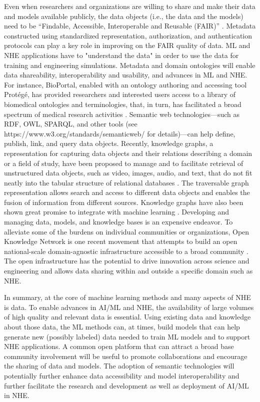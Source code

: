 Even when researchers and organizations are willing to share and make their data and models available publicly, the data objects (i.e., the data and the models) need to be ``Findable, Accessible, Interoperable and Reusable (FAIR)'' \citep{wilkinson2016fair}. Metadata constructed using standardized representation, authorization, and authentication protocols can play a key role in improving on the FAIR quality of data. ML and NHE applications have to "understand the data" in order to use the data for training and engineering simulations. Metadata and domain ontologies will enable data shareability, interoperability and usability, and advances in ML and NHE. For instance, BioPortal, enabled with an ontology authoring and accessing tool Protégé, has provided researchers and interested users access to a library of biomedical ontologies and terminologies, that, in turn, has facilitated a broad spectrum of medical research activities \citep{whetzel2011bioportal}. Semantic web technologies—such as RDF, OWL, SPARQL, and other tools (see https://www.w3.org/standards/semanticweb/ for details)—can help define, publish, link, and query data objects. Recently, knowledge graphs, a representation for capturing data objects and their relations describing a domain or a field of study, have been proposed to manage and to facilitate retrieval of unstructured data objects, such as video, images, audio, and text, that do not fit neatly into the tabular structure of relational databases \citep{paulheim2016knowledge,bonatti2018knowledge,reinanda2020knowledge}. The traversable graph representation allows search and access to different data objects and enables the fusion of information from different sources. Knowledge graphs have also been shown great promise to integrate with machine learning \citep{lin2018multihop}. Developing and managing data, models, and knowledge bases is an expensive endeavor. To alleviate some of the burdens on individual communities or organizations, Open Knowledge Network is one recent movement that attempts to build an open national-scale domain-agnostic infrastructure accessible to a broad community \citep{baru2017open}. The open infrastructure has the potential to drive innovation across science and engineering and allows data sharing within and outside a specific domain such as NHE.

In summary, at the core of machine learning methods and many aspects of NHE is data. To enable advances in AI/ML and NHE, the availability of large volumes of high quality and relevant data is essential. Using existing data and knowledge about those data, the ML methods can, at times, build models that can help generate new (possibly labeled) data needed to train ML models and to support NHE applications. A common open platform that can attract a broad base community involvement will be useful to promote collaborations and encourage the sharing of data and models. The adoption of semantic technologies will potentially further enhance data accessibility and model interoperability and further facilitate the research and development as well as deployment of AI/ML in NHE. 

